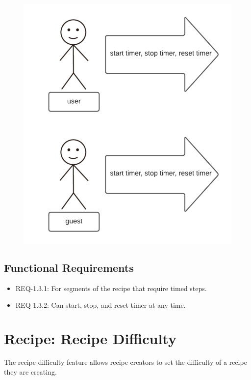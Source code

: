 \documentclass{scrreprt}
\begin{document}
\begin{figure}[H]\centering
    \includegraphics[width=\columnwidth]{response diagrams/Timer.png}
\end{figure}

\subsection{\gls{Functional Requirements}}

\begin{itemize}
    \item REQ-1.3.1: For segments of the recipe that require timed steps.
    \item REQ-1.3.2: Can start, stop, and reset timer at any time.
\end{itemize}

\section{Recipe: Recipe Difficulty}

The recipe difficulty feature allows recipe creators to set the difficulty of a recipe they are creating.
\end{document}
